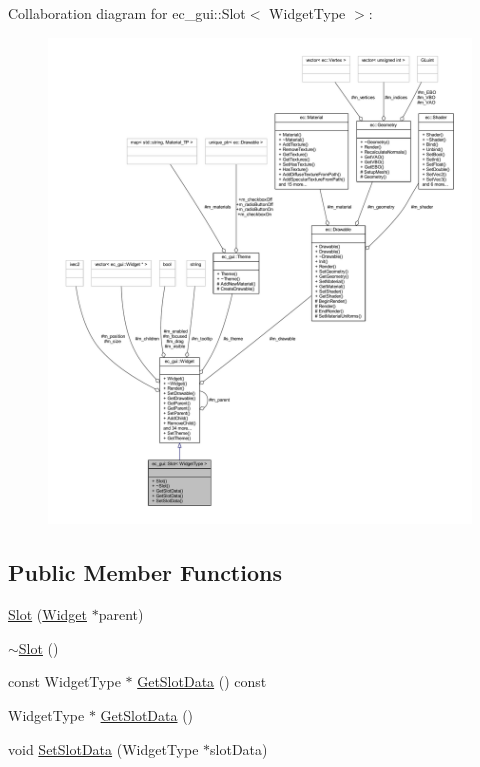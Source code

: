 Collaboration diagram for ec\+\_\+gui\+:\+:Slot$<$ Widget\+Type $>$\+:\nopagebreak
\begin{figure}[H]
\begin{center}
\leavevmode
\includegraphics[width=350pt]{classec__gui_1_1_slot__coll__graph}
\end{center}
\end{figure}
\subsection*{Public Member Functions}
\begin{DoxyCompactItemize}
\item 
\mbox{\hyperlink{classec__gui_1_1_slot_a52d05e762113bda0831abaa8a6ae4f61}{Slot}} (\mbox{\hyperlink{classec__gui_1_1_widget}{Widget}} $\ast$parent)
\item 
\mbox{\hyperlink{classec__gui_1_1_slot_ae1731e73159b5b0564bdb69786b538ce}{$\sim$\+Slot}} ()
\item 
const Widget\+Type $\ast$ \mbox{\hyperlink{classec__gui_1_1_slot_a9fe979317f793129e1f1a25e7aa554d1}{Get\+Slot\+Data}} () const
\item 
Widget\+Type $\ast$ \mbox{\hyperlink{classec__gui_1_1_slot_a4f095102292e99216422f32248d9189f}{Get\+Slot\+Data}} ()
\item 
void \mbox{\hyperlink{classec__gui_1_1_slot_a1c250069c2168720fdbf581e12643bc4}{Set\+Slot\+Data}} (Widget\+Type $\ast$slot\+Data)
\end{DoxyCompactItemize}
